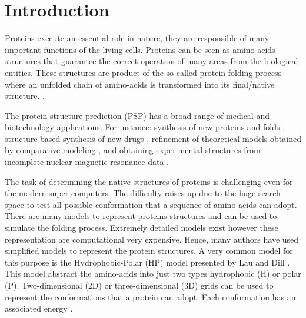\documentclass[conference]{IEEEtran}
\begin{document}
\section{Introduction}

%
Proteins execute an essential role in nature, they are responsible of many important functions of the living cells. Proteins can be seen as amino-acids structures  that guarantee the correct operation of many areas from the biological entities. These structures are product of the so-called protein folding process where an unfolded chain of amino-acids is transformed into its final/native structure.
.

The protein structure prediction (PSP) has a broad range of  medical and biotechnology applications. For instance: synthesis of new proteins and folds \cite{wang2012structural}, structure based synthesis of new drugs \cite{davis2009rosettaligand}, refinement of theoretical models obtained by comparative modeling \cite{qian2004improvement, krieger2009improving}, and
obtaining experimental structures from incomplete nuclear magnetic resonance data  \cite{shen2009novo}.  

The task of determining the native structures of proteins is challenging even for the modern super computers. The difficulty raises up due to the huge search space to test all possible conformation that a sequence of amino-acids can adopt. There are many models to represent proteins structures and can be used to simulate the folding process. Extremely detailed models exist however these representation are computational very expensive. Hence, many authors \cite{custodio2004investigation,hsu2003growth,lin2011protein,unger1993genetic,santana2008component,custodio2014multiple, garza2012locality} have used simplified models to represent the protein structures. A very common model for this purpose is the Hydrophobic-Polar (HP) model presented by Lau and Dill \cite{lau1989lattice}. This model abstract the amino-acids into just two types hydrophobic (H) or polar (P). Two-dimensional (2D) or three-dimensional (3D) grids can be used to represent the conformations that a protein can adopt. Each conformation has an associated energy \cite{unger1993genetic}. 
\end{document}
